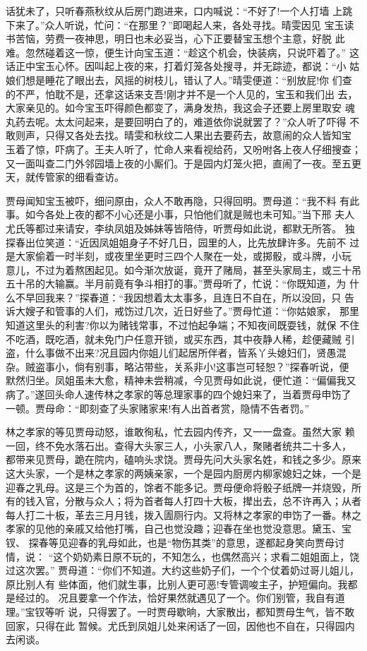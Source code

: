 话犹未了，只听春燕秋纹从后房门跑进来，口内喊说：“不好了!一个人打墙
上跳下来了。”众人听说，忙问：“在那里？”即喝起人来，各处寻找。晴雯因见
宝玉读书苦恼，劳费一夜神思，明日也未必妥当，心下正要替宝玉想个主意，好脱
此难。忽然碰着这一惊，便生计向宝玉道：“趁这个机会，快装病，只说吓着了。”
这话正中宝玉心怀。因叫起上夜的来，打着灯笼各处搜寻，并无踪迹，都说：“小
姑娘们想是睡花了眼出去，风摇的树枝儿，错认了人。”晴雯便道：“别放屁!你
们查的不严，怕耽不是，还拿这话来支吾!刚才并不是一个人见的，宝玉和我们出
去，大家亲见的。如今宝玉吓得颜色都变了，满身发热，我这会子还要上房里取安
魂丸药去呢。太太问起来，是要回明白了的，难道依你说就罢了？”众人听了吓得
不敢则声，只得又各处去找。晴雯和秋纹二人果出去要药去，故意闹的众人皆知宝
玉着了惊，吓病了。王夫人听了，忙命人来看视给药，又吩咐各上夜人仔细搜查；
又一面叫查二门外邻园墙上夜的小厮们。于是园内灯笼火把，直闹了一夜。至五更
天，就传管家的细看查访。

贾母闻知宝玉被吓，细问原由，众人不敢再隐，只得回明。贾母道：“我不料
有此事。如今各处上夜的都不小心还是小事，只怕他们就是贼也未可知。”当下邢
夫人尤氏等都过来请安，李纨凤姐及姊妹等皆陪侍，听贾母如此说，都默无所答。
独探春出位笑道：“近因凤姐姐身子不好几日，园里的人，比先放肆许多。先前不
过是大家偷着一时半刻，或夜里坐更时三四个人聚在一处，或掷骰，或斗牌，小玩
意儿，不过为着熬困起见。如今渐次放诞，竟开了赌局，甚至头家局主，或三十吊
五十吊的大输赢。半月前竟有争斗相打的事。”贾母听了，忙说：“你既知道，为
什么不早回我来？”探春道：“我因想着太太事多，且连日不自在，所以没回，只
告诉大嫂子和管事的人们，戒饬过几次，近日好些了。”贾母忙道：“你姑娘家，
那里知道这里头的利害?你以为赌钱常事，不过怕起争端；不知夜间既耍钱，就保
不住不吃酒，既吃酒，就未免门户任意开锁，或买东西，其中夜静人稀，趁便藏贼
引盗，什么事做不出来?况且园内你姐儿们起居所伴者，皆系丫头媳妇们，贤愚混
杂。贼盗事小，倘有别事，略沾带些，关系非小!这事岂可轻恕？”探春听说，便
默然归坐。凤姐虽未大愈，精神未尝稍减，今见贾母如此说，便忙道：“偏偏我又
病了。”遂回头命人速传林之孝家的等总理家事的四个媳妇来了，当着贾母申饬了
一顿。贾母命：“即刻查了头家赌家来!有人出首者赏，隐情不告者罚。”

林之孝家的等见贾母动怒，谁敢徇私，忙去园内传齐，又一一盘查。虽然大家
赖一回，终不免水落石出。查得大头家三人，小头家八人，聚赌者统共二十多人，
都带来见贾母，跪在院内，磕响头求饶。贾母先问大头家名姓，和钱之多少。原来
这大头家，一个是林之孝家的两姨亲家，一个是园内厨房内柳家媳妇之妹，一个是
迎春之乳母。这是三个为首的，馀者不能多记。贾母便命将骰子纸牌一并烧毁，所
有的钱入官，分散与众人；将为首者每人打四十大板，撵出去，总不许再入；从者
每人打二十板，革去三月月钱，拨入圊厕行内。又将林之孝家的申饬了一番。林之
孝家的见他的亲戚又给他打嘴，自己也觉没趣；迎春在坐也觉没意思。黛玉、宝钗、
探春等见迎春的乳母如此，也是“物伤其类”的意思，遂都起身笑向贾母讨情，说：
“这个奶奶素日原不玩的，不知怎么，也偶然高兴；求看二姐姐面上，饶过这次罢。”
贾母道：“你们不知道。大约这些奶子们，一个个仗着奶过哥儿姐儿，原比别人有
些体面，他们就生事，比别人更可恶!专管调唆主子，护短偏向。我都是经过的。
况且要拿一个作法，恰好果然就遇见了一个。你们别管，我自有道理。”宝钗等听
说，只得罢了。一时贾母歇晌，大家散出，都知贾母生气，皆不敢回家，只得在此
暂候。尤氏到凤姐儿处来闲话了一回，因他也不自在，只得园内去闲谈。

